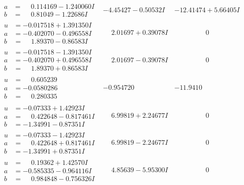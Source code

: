 \documentclass[1p]{elsarticle_modified}
\theoremstyle{definition}
\begin{document}
$$\begin{array}{c|c|c}
\begin{aligned}
a &= \phantom{-}0.114169 - 1.240060 I \\
b &= \phantom{-}0.81049 - 1.22686 I\end{aligned}
 & -4.45427 - 0.50532 I & -12.41474 + 5.66405 I \\ \hline\begin{aligned}
u &= -0.017518 + 1.391350 I \\
a &= -0.402070 - 0.496558 I \\
b &= \phantom{-}1.89370 - 0.86583 I\end{aligned}
 & \phantom{-}2.01697 + 0.39078 I & \phantom{-0.000000 } 0 \\ \hline\begin{aligned}
u &= -0.017518 - 1.391350 I \\
a &= -0.402070 + 0.496558 I \\
b &= \phantom{-}1.89370 + 0.86583 I\end{aligned}
 & \phantom{-}2.01697 - 0.39078 I & \phantom{-0.000000 } 0 \\ \hline\begin{aligned}
u &= \phantom{-}0.605239\phantom{ +0.000000I} \\
a &= -0.0580286\phantom{ +0.000000I} \\
b &= \phantom{-}0.280335\phantom{ +0.000000I}\end{aligned}
 & -0.954720\phantom{ +0.000000I} & -11.9410\phantom{ +0.000000I} \\ \hline\begin{aligned}
u &= -0.07333 + 1.42923 I \\
a &= \phantom{-}0.422648 - 0.817461 I \\
b &= -1.34991 - 0.87351 I\end{aligned}
 & \phantom{-}6.99819 + 2.24677 I & \phantom{-0.000000 } 0 \\ \hline\begin{aligned}
u &= -0.07333 - 1.42923 I \\
a &= \phantom{-}0.422648 + 0.817461 I \\
b &= -1.34991 + 0.87351 I\end{aligned}
 & \phantom{-}6.99819 - 2.24677 I & \phantom{-0.000000 } 0 \\ \hline\begin{aligned}
u &= \phantom{-}0.19362 + 1.42570 I \\
a &= -0.585335 - 0.964116 I \\
b &= \phantom{-}0.984848 - 0.756326 I\end{aligned}
 & \phantom{-}4.85639 - 5.95300 I & \phantom{-0.000000 } 0\\

\end{array}$$
\end{document}
